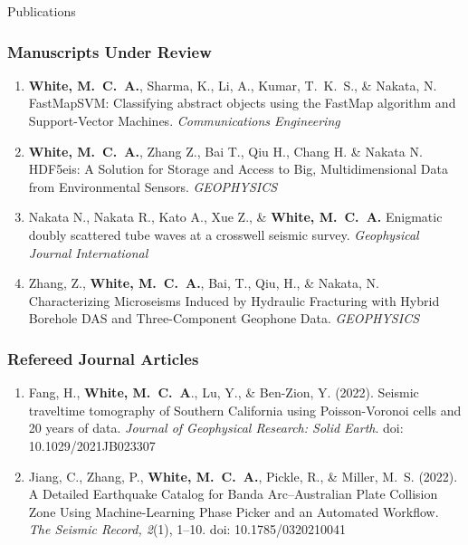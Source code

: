 \begin{rSection}{Publications}
	\subsubsection*{Manuscripts Under Review}
	\begin{enumerate}
		\item \textbf{White, M.~C.~A.}, Sharma, K., Li, A., Kumar, T.~K.~S., \& Nakata, N. FastMapSVM: Classifying abstract objects using the FastMap algorithm and Support-Vector Machines. \textit{Communications Engineering}
		
		\item \textbf{White, M.~C.~A.}, Zhang Z., Bai T., Qiu H., Chang H. \& Nakata N. HDF5eis: A Solution for Storage and Access to Big, Multidimensional Data from Environmental Sensors. \textit{GEOPHYSICS}
		
		\item Nakata N., Nakata R., Kato A., Xue Z., \& \textbf{White, M.~C.~A.} Enigmatic doubly scattered tube waves at a crosswell seismic survey. \textit{Geophysical Journal International}
		
		\item Zhang, Z., \textbf{White, M.~C.~A.}, Bai, T., Qiu, H., \& Nakata, N. Characterizing Microseisms Induced by Hydraulic Fracturing with Hybrid Borehole DAS and Three-Component Geophone Data. \textit{GEOPHYSICS}
	\end{enumerate}
	\subsubsection*{Refereed Journal Articles}
		\begin{enumerate}
		\item Fang, H., \textbf{White, M.~C.~A}., Lu, Y., \& Ben-Zion, Y. (2022). Seismic traveltime tomography of Southern California using Poisson-Voronoi cells and 20 years of data. \textit{Journal of Geophysical Research: Solid Earth}. doi: 10.1029/2021JB023307
		
		
		\item Jiang, C., Zhang, P., \textbf{White, M.~C.~A.}, Pickle, R., \& Miller, M.~S. (2022). A Detailed Earthquake Catalog for Banda Arc–Australian Plate Collision Zone Using Machine-Learning Phase Picker and an Automated Workflow. \textit{The Seismic Record, 2}(1), 1–10. doi: 10.1785/0320210041
		

\end{enumerate}
\end{rSection}
